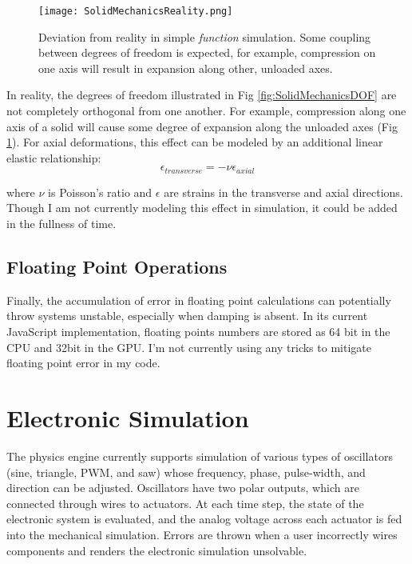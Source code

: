 {\begin{figure}
  \texttt{[image: SolidMechanicsReality.png]}
  \caption{Deviation from reality in simple \textit{function} simulation.  Some coupling between degrees of freedom is expected, for example, compression on one axis will result in expansion along other, unloaded axes.}
  \label{fig:SolidMechanicsReality}
\end{figure}

In reality, the degrees of freedom illustrated in Fig \ref{fig:SolidMechanicsDOF} are not completely orthogonal from one another.  For example, compression along one axis of a solid will cause some degree of expansion along the unloaded axes (Fig \ref{fig:SolidMechanicsReality}).  For axial deformations, this effect can be modeled by an additional linear elastic relationship:
\[ \epsilon_{transverse} = -\nu \epsilon_{axial}\]

where $\nu$ is Poisson's ratio and $\epsilon$ are strains in the transverse and axial directions.\\

Though I am not currently modeling this effect in simulation, it could be added in the fullness of time.

%

\subsection{Floating Point Operations}

Finally, the accumulation of error in floating point calculations can potentially throw systems unstable, especially when damping is absent.  In its current JavaScript implementation, floating points numbers are stored as 64 bit in the CPU and 32bit in the GPU.  I'm not currently using any tricks to mitigate floating point error in my code.

\section{Electronic Simulation}\label{sec:electronicSim}

The physics engine currently supports simulation of various types of oscillators (sine, triangle, PWM, and saw) whose frequency, phase, pulse-width, and direction can be adjusted.  Oscillators have two polar outputs, which are connected through wires to actuators.  At each time step, the state of the electronic system is evaluated, and the analog voltage across each actuator is fed into the mechanical simulation.  Errors are thrown when a user incorrectly wires components and renders the electronic simulation unsolvable.\\

}
